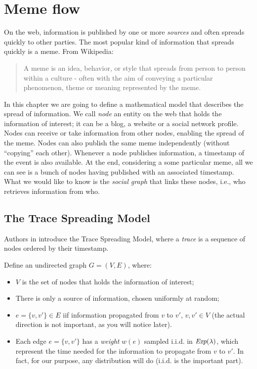 \chapter{Meme flow}

On the web, information is published by one or more \emph{sources} and often spreads quickly to other parties. The most popular kind of information that spreads quickly is a meme. From Wikipedia:

\begin{quote}
	A meme is an idea, behavior, or style that spreads from person to person within a culture - often with the aim of conveying a particular phenomenon, theme or meaning represented by the meme.
\end{quote}

In this chapter we are going to define a mathematical model that describes the spread of information. We call \emph{node} an entity on the web that holds the information of interest; it can be a blog, a website or a social network profile. Nodes can receive or take information from other nodes, enabling the spread of the meme. Nodes can also publish the same meme independently (without ``copying'' each other). Whenever a node publishes information, a timestamp of the event is also available. At the end, considering a some particular meme,  all we can see is a bunch of nodes having published with an associated timestamp. What we would like to know is the \emph{social graph} that links these nodes, i.e., who retrieves information from who.

\section{The Trace Spreading Model}

Authors in \cite{KDD10} introduce the Trace Spreading Model, where a \emph{trace} is a sequence of nodes ordered by their timestamp.

Define an undirected graph $G = (V, E)$, where:
\begin{itemize}
 \item $V$ is the set of nodes that holds the information of interest;
 \item There is only a source of information, chosen uniformly at random;
 \item $e = \{v, v'\} \in E$ iif information propagated from $v$ to $v'$, $v, v' \in V$ (the actual direction is not important, as you will notice later). 
 \item Each edge $e = \{v, v'\}$ has a \emph{weight} $w(e)$ sampled i.i.d. in $\emph{Exp}(\lambda)$, which represent the time needed for the information to propagate from $v$ to $v'$. In fact, for our purpose, any distribution will do (i.i.d. is the important part).
\end{itemize}

